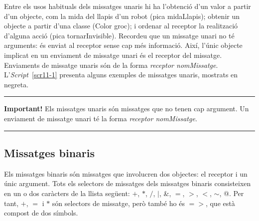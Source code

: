 Entre els usos habituals dels missatges unaris hi ha l'obtenció d'un valor a partir d'un objecte, com la mida del llapis d'un robot (\textsf{pica midaLlapis}); obtenir un objecte a partir d'una classe (\textsf{Color groc}); i ordenar al receptor la realització d'alguna acció (\textsf{pica tornarInvisible}). Recordeu que un missatge unari no té arguments: és enviat al receptor sense cap més informació. Així, l'únic objecte implicat en un enviament de missatge unari és el receptor del missatge. Enviaments de missatge unaris són de la forma \textsf{{\itshape receptor nomMissatge}}. L'\emph{Script}~\ref{scr11-1} presenta alguns exemples de missatges unaris, mostrats en negreta.
\noindent
\rule{\textwidth}{2pt}
\noindent
\textbf{Important!} Els missatges unaris són missatges que no tenen cap argument. Un enviament de missatge unari té la forma \textsf{{\itshape receptor nomMissatge}}.

\noindent
\rule{\textwidth}{2pt}

\subsection{Missatges binaris}
Els missatges binaris són missatges que involucren dos objectes: el receptor i un únic argument. Tots els selectors de missatges dels missatges binaris consisteixen en un o dos caràcters de la llista següent: \textsf{$+$}, \textsf{$*$}, \textsf{$/$}, \textsf{$|$}, \textsf{\&}, \textsf{$=$}, \textsf{$>$}, \textsf{$<$}, \textsf{$\sim$}, \textsf{@}. Per tant, \textsf{$+$},  \textsf{$=$} i  \textsf{$*$} són selectors de missatge, però també ho és  \textsf{$=>$}, que està compost de dos símbols.

